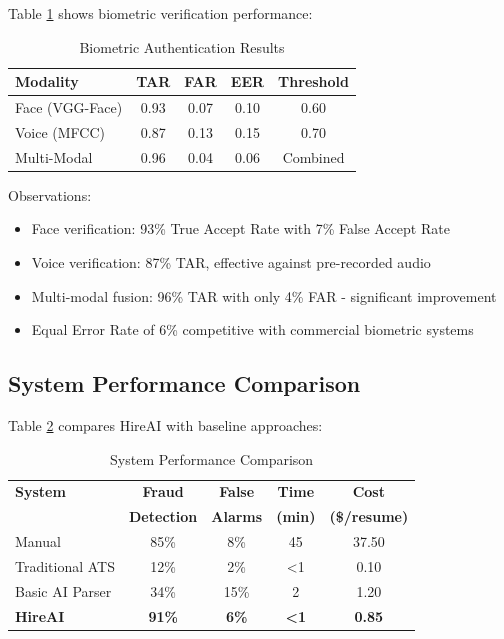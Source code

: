 \documentclass[journal]{IEEEtran}
\begin{document}
Table \ref{tab:bio_results} shows biometric verification performance:

\begin{table}[h]
\centering
\caption{Biometric Authentication Results}
\label{tab:bio_results}
\begin{tabular}{@{}lcccc@{}}
\toprule
\textbf{Modality} & \textbf{TAR} & \textbf{FAR} & \textbf{EER} & \textbf{Threshold} \\
\midrule
Face (VGG-Face) & 0.93 & 0.07 & 0.10 & 0.60 \\
Voice (MFCC) & 0.87 & 0.13 & 0.15 & 0.70 \\
Multi-Modal & 0.96 & 0.04 & 0.06 & Combined \\
\bottomrule
\end{tabular}
\end{table}

Observations:
\begin{itemize}
\item Face verification: 93\% True Accept Rate with 7\% False Accept Rate
\item Voice verification: 87\% TAR, effective against pre-recorded audio
\item Multi-modal fusion: 96\% TAR with only 4\% FAR - significant improvement
\item Equal Error Rate of 6\% competitive with commercial biometric systems
\end{itemize}

\subsection{System Performance Comparison}

Table \ref{tab:system_comparison} compares HireAI with baseline approaches:

\begin{table}[h]
\centering
\caption{System Performance Comparison}
\label{tab:system_comparison}
\begin{tabular}{@{}lcccc@{}}
\toprule
\textbf{System} & \textbf{Fraud} & \textbf{False} & \textbf{Time} & \textbf{Cost} \\
 & \textbf{Detection} & \textbf{Alarms} & \textbf{(min)} & \textbf{(\$/resume)} \\
\midrule
Manual & 85\% & 8\% & 45 & 37.50 \\
Traditional ATS & 12\% & 2\% & <1 & 0.10 \\
Basic AI Parser & 34\% & 15\% & 2 & 1.20 \\
\textbf{HireAI} & \textbf{91\%} & \textbf{6\%} & \textbf{<1} & \textbf{0.85} \\
\bottomrule
\end{tabular}
\end{table}
\end{document}
